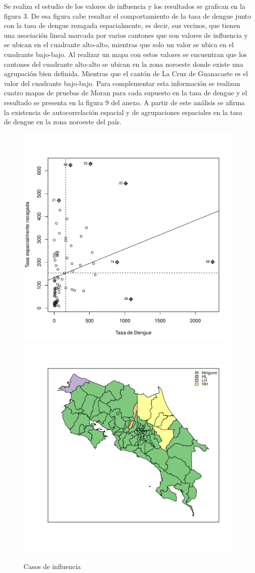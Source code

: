 \documentclass[12pt,a4paper]{article}
\begin{document}
Se realiza el estudio de los valores de influencia y los resultados se grafican en la figura 3. De esa figura cabe resaltar el comportamiento de la tasa de dengue junto con la tasa de dengue rezagada espacialmente, es decir, sus vecinos, que tienen una asociación lineal marcada por varios cantones que son valores de influencia y se ubican en el cuadrante alto-alto, mientras que solo un valor se ubica en el cuadrante bajo-bajo. Al realizar un mapa con estos valores se encuentran que los cantones del cuadrante alto-alto se ubican en la zona noroeste donde existe una agrupación bien definida. Mientras que el cantón de La Cruz de Guanacaste es el valor del cuadrante bajo-bajo. Para complementar esta información se realizan cuatro mapas de pruebas de Moran para cada supuesto en la tasa de dengue y el resultado se presenta en la figura 9 del anexo. A partir de este análisis se afirma la existencia de autocorrelación espacial y de agrupaciones espaciales en la tasa de dengue en la zona noroeste del país.

\begin{figure}[hbtp]
\centering
\includegraphics[width=.48\textwidth]{F31.pdf}
\includegraphics[width=.48\textwidth]{F32.pdf}
\caption{Casos de influencia}
\end{figure}
\end{document}

